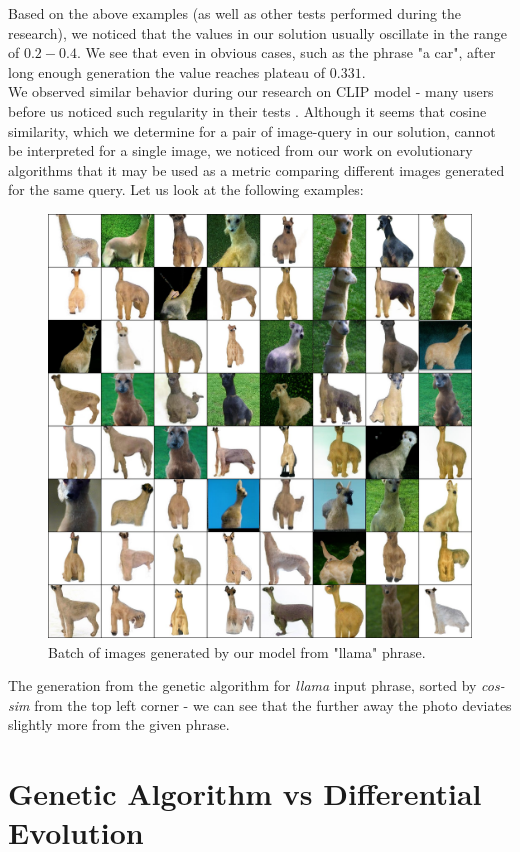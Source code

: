 \documentclass[12pt,a4paper,openany]{book}
\begin{document}
\noindent Based on the above examples (as well as other tests performed during the research), we noticed that the values in our solution usually oscillate in the range of $0.2 - 0.4$. We see that even in obvious cases, such as the phrase "a car", after long enough generation the value reaches plateau of $0.331$.  \\
\noindent We observed similar behavior during our research on CLIP model - many users before us noticed such regularity in their tests \cite{clipresults}.
Although it seems that cosine similarity, which we determine for a pair of image-query in our solution, cannot be interpreted for a single image, we noticed from our work on evolutionary algorithms that it may be used as a metric comparing different images generated for the same query. Let us look at the following examples:
\begin{figure}[H]
    \centering
    \includegraphics[scale=0.2]{figs/batch_loop_7.jpg}
    \caption{Batch of images generated by our model from "llama" phrase.}
\end{figure}
\noindent The generation from the genetic algorithm for \textit{llama} input phrase,  sorted by \textit{cos-sim} from the top left corner - we can see that the further away the photo deviates slightly more from the given phrase. 

\section{Genetic Algorithm vs Differential Evolution}
\end{document}
